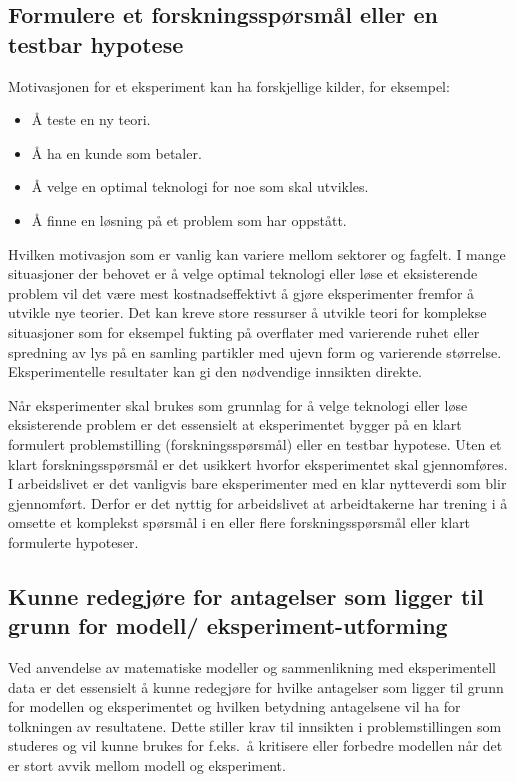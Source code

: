 \documentclass{article}
\begin{document}
\subsection{Formulere et forskningsspørsmål eller en testbar hypotese}
Motivasjonen for et eksperiment kan ha forskjellige kilder, for eksempel:
\begin{itemize}
  \item Å teste en ny teori.
  \item Å ha en kunde som betaler.
  \item Å velge en optimal teknologi for noe som skal utvikles.
  \item Å finne en løsning på et problem som har oppstått.
\end{itemize}

Hvilken motivasjon som er vanlig kan variere mellom sektorer og fagfelt.
I mange situasjoner der behovet er å velge optimal teknologi eller løse et eksisterende problem vil det være mest kostnadseffektivt å gjøre eksperimenter fremfor å utvikle nye teorier.
Det kan kreve store ressurser å utvikle teori for komplekse situasjoner som for eksempel fukting på overflater med varierende ruhet eller spredning av lys på en samling partikler med ujevn form og varierende størrelse.
Eksperimentelle resultater kan gi den nødvendige innsikten direkte.

Når eksperimenter skal brukes som grunnlag for å velge teknologi eller løse eksisterende problem er det essensielt at eksperimentet bygger på en klart formulert problemstilling (forskningsspørsmål) eller en testbar hypotese. Uten et klart forskningsspørsmål er det usikkert hvorfor eksperimentet skal gjennomføres. I arbeidslivet er det vanligvis bare eksperimenter med en klar nytteverdi som blir gjennomført. Derfor er det nyttig for arbeidslivet at arbeidtakerne har trening i å omsette et komplekst spørsmål i en eller flere forskningsspørsmål eller klart formulerte hypoteser.

\subsection{Kunne redegjøre for antagelser som ligger til grunn for modell/ eksperiment-utforming}
Ved anvendelse av matematiske modeller og sammenlikning med eksperimentell data er det essensielt å kunne redegjøre for hvilke antagelser som ligger til grunn for modellen og eksperimentet og hvilken betydning antagelsene vil ha for tolkningen av resultatene.
Dette stiller krav til innsikten i problemstillingen som studeres og vil kunne brukes for f.eks.~å kritisere eller forbedre modellen når det er stort avvik mellom modell og eksperiment.
\end{document}
